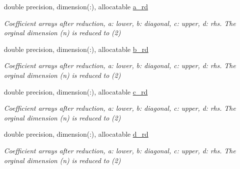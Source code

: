 \begin{DoxyCompactItemize}
\item 
double precision, dimension(\+:), allocatable \mbox{\hyperlink{structpascal__tdma_1_1ptdma__plan__single_a732d93dcbef429c1396a6f7ace9cefa6}{a\+\_\+rd}}
\begin{DoxyCompactList}\small\item\em Coefficient arrays after reduction, a\+: lower, b\+: diagonal, c\+: upper, d\+: rhs. The orginal dimension (n) is reduced to (2) \end{DoxyCompactList}\item 
double precision, dimension(\+:), allocatable \mbox{\hyperlink{structpascal__tdma_1_1ptdma__plan__single_acf24e954fa50a47ece2c59598b81c157}{b\+\_\+rd}}
\begin{DoxyCompactList}\small\item\em Coefficient arrays after reduction, a\+: lower, b\+: diagonal, c\+: upper, d\+: rhs. The orginal dimension (n) is reduced to (2) \end{DoxyCompactList}\item 
double precision, dimension(\+:), allocatable \mbox{\hyperlink{structpascal__tdma_1_1ptdma__plan__single_a9450979ebd66ed321f27165c8e13629f}{c\+\_\+rd}}
\begin{DoxyCompactList}\small\item\em Coefficient arrays after reduction, a\+: lower, b\+: diagonal, c\+: upper, d\+: rhs. The orginal dimension (n) is reduced to (2) \end{DoxyCompactList}\item 
double precision, dimension(\+:), allocatable \mbox{\hyperlink{structpascal__tdma_1_1ptdma__plan__single_a8b99edaa7ecd71fe6ceafd9c69d9a374}{d\+\_\+rd}}
\begin{DoxyCompactList}\small\item\em Coefficient arrays after reduction, a\+: lower, b\+: diagonal, c\+: upper, d\+: rhs. The orginal dimension (n) is reduced to (2) \end{DoxyCompactList}\end{DoxyCompactItemize}

